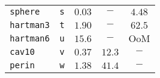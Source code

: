\begin{tabular}{p{2.3cm}cccc}
\multirow{1}{*}{\texttt{sphere}} & \texttt{s} &
$\mathbf{0.03}$ & $-$ & $4.48$\\
\multirow{1}{*}{\texttt{hartman3}} & \texttt{t} &
$\mathbf{1.90}$ & $-$ & $62.5$ \\
\multirow{1}{*}{\texttt{hartman6}} & \texttt{u} &
$\mathbf{15.6}$ & $-$ & $\text{OoM}$ \\
\multirow{1}{*}{\texttt{cav10}} & \texttt{v} &
$\mathbf{0.37}$ & $12.3$ & $-$ \\
\multirow{1}{*}{\texttt{perin}} & \texttt{w} &
$\mathbf{1.38}$ & $41.4$ & $-$ \\
\hline
\end{tabular}
